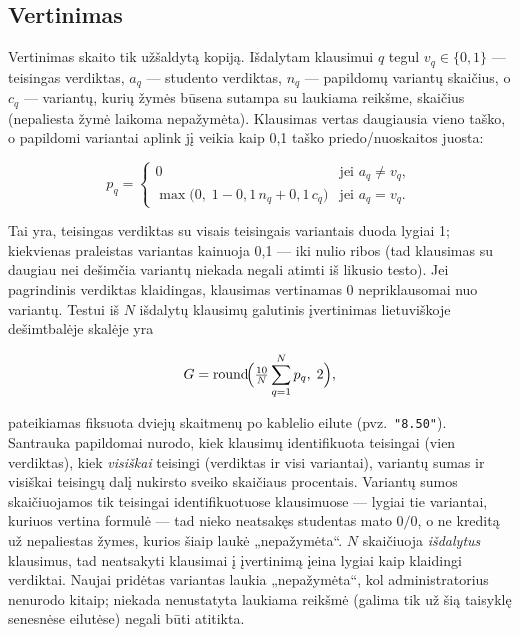 \documentclass[11pt,a4paper]{article}
\newcommand{\code}[1]{\texttt{#1}}
\begin{document}
\subsection{Vertinimas}
\label{sec:grading}

Vertinimas skaito tik užšaldytą kopiją. Išdalytam klausimui $q$ tegul
$v_q \in \{0,1\}$ — teisingas verdiktas, $a_q$ — studento verdiktas,
$n_q$ — papildomų variantų skaičius, o $c_q$ — variantų, kurių žymės
būsena sutampa su laukiama reikšme, skaičius (nepaliesta žymė
laikoma nepažymėta). Klausimas vertas daugiausia vieno taško, o
papildomi variantai aplink jį veikia kaip 0,1 taško
priedo/nuoskaitos juosta:

\begin{equation*}
p_q =
\begin{cases}
  0 & \text{jei } a_q \neq v_q,\\[2pt]
  \max\bigl(0,\; 1 - 0{,}1\,n_q + 0{,}1\,c_q\bigr) & \text{jei } a_q = v_q.
\end{cases}
\end{equation*}

Tai yra, teisingas verdiktas su visais teisingais variantais duoda
lygiai 1; kiekvienas praleistas variantas kainuoja 0,1 — iki nulio
ribos (tad klausimas su daugiau nei dešimčia variantų niekada negali
atimti iš likusio testo). Jei pagrindinis verdiktas klaidingas,
klausimas vertinamas 0 nepriklausomai nuo variantų. Testui iš $N$ išdalytų klausimų
galutinis įvertinimas lietuviškoje dešimtbalėje skalėje yra

\begin{equation*}
G = \operatorname{round}\!\Bigl(\tfrac{10}{N}\sum_{q=1}^{N} p_q,\; 2\Bigr),
\end{equation*}

pateikiamas fiksuota dviejų skaitmenų po kablelio eilute (pvz.\
\code{"8.50"}). Santrauka papildomai nurodo, kiek klausimų
identifikuota teisingai (vien verdiktas), kiek \emph{visiškai}
teisingi (verdiktas ir visi variantai), variantų sumas ir visiškai
teisingų dalį nukirsto sveiko skaičiaus procentais. Variantų sumos
skaičiuojamos tik teisingai identifikuotuose klausimuose — lygiai tie
variantai, kuriuos vertina formulė — tad nieko neatsakęs studentas mato
$0/0$, o ne kreditą už nepaliestas žymes, kurios šiaip laukė
„nepažymėta``. $N$ skaičiuoja \emph{išdalytus} klausimus, tad
neatsakyti klausimai į įvertinimą įeina lygiai kaip klaidingi
verdiktai. Naujai pridėtas variantas laukia „nepažymėta``, kol
administratorius nenurodo kitaip; niekada nenustatyta laukiama reikšmė
(galima tik už šią taisyklę senesnėse eilutėse) negali būti atitikta.
\end{document}
